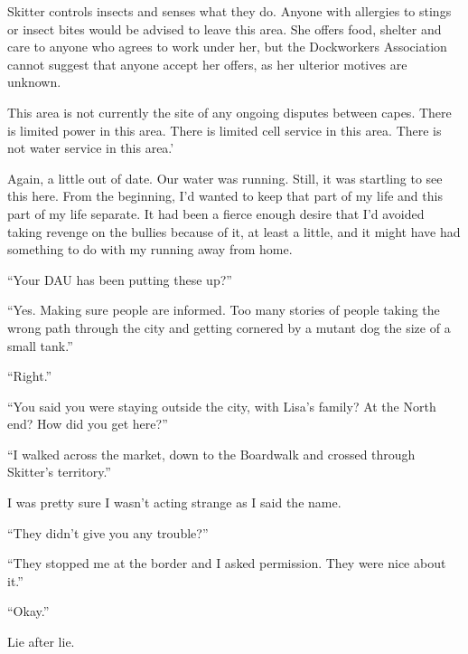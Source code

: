 Skitter controls insects and senses what they do.  Anyone with allergies to stings or insect bites would be advised to leave this area.  She offers food, shelter and care to anyone who agrees to work under her, but the Dockworkers Association cannot suggest that anyone accept her offers, as her ulterior motives are unknown.



This area is not currently the site of any ongoing disputes between capes.  There is limited power in this area.  There is limited cell service in this area.  There is not water service in this area.'



Again, a little out of date.  Our water was running.  Still, it was startling to see this here.  From the beginning, I'd wanted to keep that part of my life and this part of my life separate. It had been a fierce enough desire that I'd avoided taking revenge on the bullies because of it, at least a little, and it might have had something to do with my running away from home.



``Your DAU has been putting these up?''



``Yes.  Making sure people are informed.  Too many stories of people taking the wrong path through the city and getting cornered by a mutant dog the size of a small tank.''



``Right.''



``You said you were staying outside the city, with Lisa's family?  At the North end?  How did you get here?''



``I walked across the market, down to the Boardwalk and crossed through Skitter's territory.''



I was pretty sure I wasn't acting strange as I said the name.



``They didn't give you any trouble?''



``They stopped me at the border and I asked permission.  They were nice about it.''



``Okay.''



Lie after lie.



